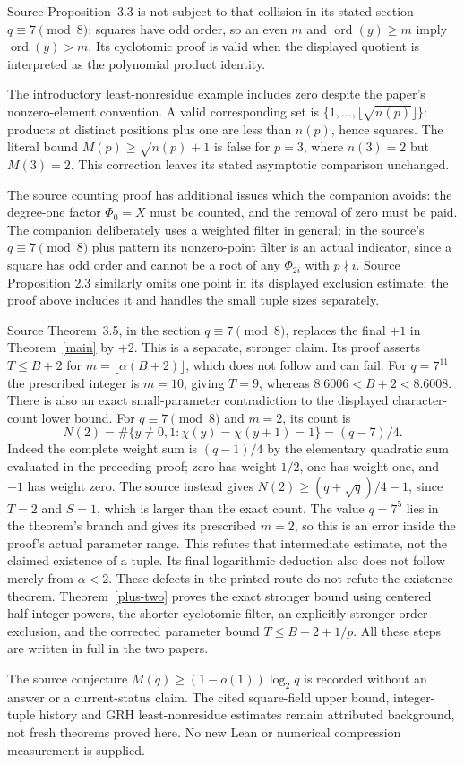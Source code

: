 \documentclass[11pt,a4paper]{article}
\newcommand{\ord}{\operatorname{ord}}
\begin{document}
Source Proposition~3.3 is not subject to that collision in its stated
section $q\equiv7\pmod8$: squares have odd order, so an even $m$ and
$\ord(y)\ge m$ imply $\ord(y)>m$. Its cyclotomic proof is valid when
the displayed quotient is interpreted as the polynomial product identity.

The introductory least-nonresidue example includes zero despite the
paper's nonzero-element convention. A valid corresponding set is
$\{1,\ldots,\lfloor\sqrt{n(p)}\rfloor\}$: products at distinct
positions plus one are less than $n(p)$, hence squares. The literal bound
$M(p)\ge\sqrt{n(p)}+1$ is false for $p=3$, where $n(3)=2$ but
$M(3)=2$. This correction leaves its stated asymptotic comparison unchanged.

The source counting proof has additional issues which the companion avoids:
the degree-one factor $\Phi_0=X$ must be counted, and the removal of zero
must be paid. The companion deliberately uses a weighted filter in general;
in the source's $q\equiv7\pmod8$ plus pattern its nonzero-point filter is
an actual indicator, since a square has odd order and cannot be a root of
any $\Phi_{2i}$ with $p\nmid i$. Source Proposition
2.3 similarly omits one point in its displayed exclusion estimate; the
proof above includes it and handles the small tuple sizes separately.

Source Theorem~3.5, in the section $q\equiv7\pmod8$, replaces the final
$+1$ in Theorem~\ref{main} by $+2$. This is a separate, stronger claim.
Its proof asserts $T\le B+2$ for
$m=\lfloor\alpha(B+2)\rfloor$, which does not follow and can fail.
For $q=7^{11}$ the prescribed integer is $m=10$, giving $T=9$, whereas
$8.6006<B+2<8.6008$. There is also an exact small-parameter contradiction
to the displayed character-count lower bound. For $q\equiv7\pmod8$
and $m=2$, its count is
\[
 N(2)=\#\{y\ne0,1:\chi(y)=\chi(y+1)=1\}=(q-7)/4.
\]
Indeed the complete weight sum is $(q-1)/4$ by the elementary quadratic
sum evaluated in the preceding proof; zero has weight $1/2$, one has
weight one, and $-1$ has weight zero. The source instead gives
$N(2)\ge(q+\sqrt q)/4-1$, since $T=2$ and $S=1$, which is larger
than the exact count. The value $q=7^5$ lies in the theorem's branch
and gives its prescribed $m=2$, so this is an error inside the proof's
actual parameter range. This refutes that intermediate estimate, not
the claimed existence of a tuple.
Its final logarithmic deduction also does not follow merely from
$\alpha<2$. These defects in the printed route do not refute the
existence theorem. Theorem~\ref{plus-two} proves the exact stronger bound
using centered half-integer powers, the shorter cyclotomic filter, an
explicitly stronger order exclusion, and the corrected parameter bound
$T\le B+2+1/p$. All these steps are written in full in the two papers.

The source conjecture $M(q)\ge(1-o(1))\log_2q$ is recorded without an
answer or a current-status claim. The cited square-field upper bound,
integer-tuple history and GRH least-nonresidue estimates remain attributed
background, not fresh theorems proved here. No new Lean or numerical
compression measurement is supplied.
\end{document}
